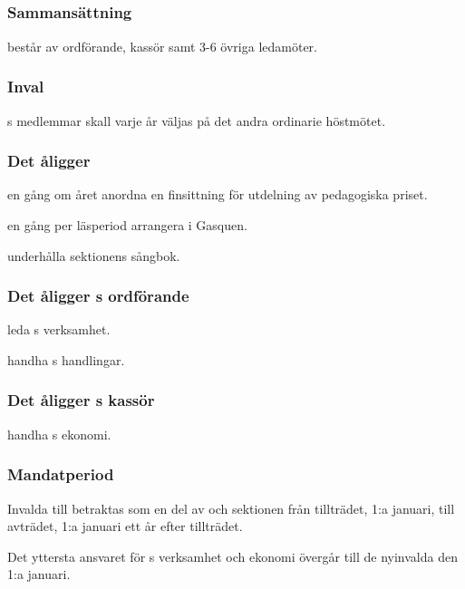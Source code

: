 \subsection{\SEXITFULL}
\subsubsection{Sammansättning}
\SEXIT{} består av ordförande, kassör samt 3-6 övriga ledamöter.

\subsubsection{Inval}
\SEXIT{}s medlemmar skall varje år väljas på det andra ordinarie höstmötet.

\subsubsection{Det åligger \SEXIT}
\begin{att}
	\item en gång om året anordna en finsittning för utdelning av pedagogiska priset.
	\item en gång per läsperiod arrangera i Gasquen.
	\item underhålla sektionens sångbok. 
\end{att}

\subsubsection{Det åligger \SEXIT{}s ordförande}
\begin{att}
	\item leda \SEXIT{}s verksamhet.
	\item handha \SEXIT{}s handlingar.
\end{att}

\subsubsection{Det åligger \SEXIT{}s kassör}
\begin{att}
	\item handha \SEXIT{}s ekonomi.
\end{att}

\subsubsection{Mandatperiod}
Invalda till \SEXIT{} betraktas som en del av \SEXIT{} och sektionen från tillträdet, 1:a januari, till avträdet, 1:a januari ett år efter tillträdet.

Det yttersta ansvaret för \SEXIT{}s verksamhet och ekonomi övergår till de nyinvalda den 1:a januari.